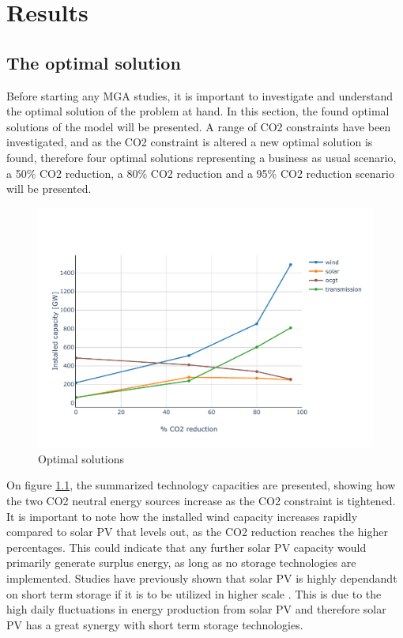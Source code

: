 
\chapter{Results}


\section{The optimal solution}
Before starting any MGA studies, it is important to investigate and understand the optimal solution of the problem at hand. In this section, the found optimal solutions of the model will be presented. A range of CO2 constraints have been investigated, and as the CO2 constraint is altered a new optimal solution is found, therefore four optimal solutions representing a business as usual scenario, a 50\% CO2 reduction, a 80\% CO2 reduction and a 95\% CO2 reduction scenario will be presented. 

\begin{figure}[h]\centering
	\includegraphics[width=1.\textwidth]{./Images/optimal_solutions_summary}
	\caption{Optimal solutions }
	\label{fig:Optimal_Solutions_summary}
\end{figure}

On figure \ref{fig:Optimal_Solutions_summary}, the summarized technology capacities are presented, showing how the two CO2 neutral energy sources increase as the CO2 constraint is tightened. It is important to note how the installed wind capacity increases rapidly compared to solar PV that levels out, as the CO2 reduction reaches the higher percentages. This could indicate that any further solar PV capacity would primarily generate surplus energy, as long as no storage technologies are implemented. Studies have previously shown that solar PV is highly dependandt on short term storage if it is to be utilized in higher scale \cite{rasmussen2011a} . This is due to the high daily fluctuations in energy production from solar PV and therefore solar PV has a great synergy with short term storage technologies. 

